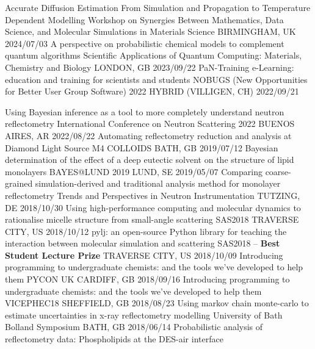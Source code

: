 \begin{cvhonors}
  \cvhonor
    {Accurate Diffusion Estimation From Simulation and Propagation to Temperature Dependent Modelling}
    {Workshop on Synergies Between Mathematics, Data Science, and Molecular Simulations in Materials Science}
    {BIRMINGHAM, UK}
    {2024/07/03}
  \cvhonor
    {A perspective on probabilistic chemical models to complement quantum algorithms}
    {Scientific Applications of Quantum Computing: Materials, Chemistry and Biology}
    {LONDON, GB}
    {2023/09/22}
  \cvhonor
    {PaN-Training e-Learning: education and training for scientists and students}
    {NOBUGS (New Opportunities for Better User Group Software) 2022}
    {HYBRID (VILLIGEN, CH)}
    {2022/09/21}
\end{cvhonors}
\begin{cvhonors} 
  \cvhonor
    {Using Bayesian inference as a tool to more completely understand neutron reflectometry}
    {International Conference on Neutron Scattering 2022}
    {BUENOS AIRES, AR}
    {2022/08/22}
  \cvhonor
    {Automating reflectometry reduction and analysis at Diamond Light Source}
    {M4 COLLOIDS}
    {BATH, GB}
    {2019/07/12}
  \cvhonor
    {Bayesian determination of the effect of a deep eutectic solvent on the structure of lipid monolayers}
    {BAYES@LUND 2019}
    {LUND, SE}
    {2019/05/07}
  \cvhonor
    {Comparing coarse-grained simulation-derived and traditional analysis method for monolayer reflectometry}
    {Trends and Perspectives in Neutron Instrumentation}
    {TUTZING, DE}
    {2018/10/30} 
  \cvhonor
    {Using high-performance computing and molecular dynamics to rationalise micelle structure from small-angle scattering}
    {SAS2018}
    {TRAVERSE CITY, US}
    {2018/10/12}
  \cvhonor
    {pylj: an open-source Python library for teaching the interaction between molecular simulation and scattering}
	{SAS2018 -- \textbf{Best Student Lecture Prize}}
    {TRAVERSE CITY, US}
    {2018/10/09}
  \cvhonor
    {Introducing programming to undergraduate chemists: and the tools we've developed to help them}
    {PYCON UK}
    {CARDIFF, GB}
    {2018/09/16}
  \cvhonor
    {Introducing programming to undergraduate chemists: and the tools we've developed to help them}
    {VICEPHEC18}
    {SHEFFIELD, GB}
    {2018/08/23}
  \cvhonor
    {Using markov chain monte-carlo to estimate uncertainties in x-ray reflectometry modelling}
    {University of Bath Bolland Symposium}
    {BATH, GB}
    {2018/06/14}
  \cvhonor
    {Probabilistic analysis of reflectometry data: Phospholipids at the DES-air interface}

\end{cvhonors}
